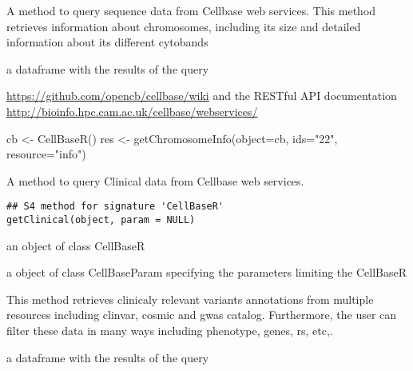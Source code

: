 \documentclass[letterpaper]{book}
\begin{document}
%
\begin{Details}\relax
A method to query sequence data from Cellbase web services. This 
method retrieves information about chromosomes, including its size and
detailed information about its different cytobands
\end{Details}
%
\begin{Value}
a dataframe with the results of the query
\end{Value}
%
\begin{SeeAlso}\relax
\url{https://github.com/opencb/cellbase/wiki} 
and the RESTful API documentation 
\url{http://bioinfo.hpc.cam.ac.uk/cellbase/webservices/}
\end{SeeAlso}
%
\begin{Examples}
\begin{ExampleCode}
   cb <- CellBaseR()
   res <- getChromosomeInfo(object=cb, ids="22", resource="info")
\end{ExampleCode}
\end{Examples}
%
\begin{Description}\relax
A method to query Clinical data from Cellbase web services.
\end{Description}
%
\begin{Usage}
\begin{verbatim}
## S4 method for signature 'CellBaseR'
getClinical(object, param = NULL)
\end{verbatim}
\end{Usage}
%
\begin{Arguments}
\begin{ldescription}
\item[\code{object}] an object of class CellBaseR

\item[\code{param}] a object of class CellBaseParam specifying the parameters
limiting the CellBaseR
\end{ldescription}
\end{Arguments}
%
\begin{Details}\relax
This method retrieves clinicaly relevant variants annotations from
multiple resources including clinvar, cosmic and gwas catalog. Furthermore,
the user can filter these data in many ways including phenotype, genes, rs,
etc,.
\end{Details}
%
\begin{Value}
a dataframe with the results of the query
\end{Value}
\end{document}
